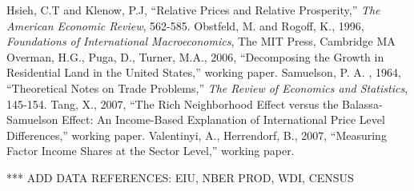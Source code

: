 \documentclass[12pt]{article}
\begin{document}
\begin{thebibliography}{99}
 Hsieh, C.T and Klenow, P.J, ``Relative Prices and
Relative Prosperity,'' \emph{The American Economic Review}, 562-585.
 Obstfeld, M. and Rogoff, K., 1996, \emph{Foundations of International Macroeconomics}, The MIT Press, Cambridge MA
 Overman, H.G., Puga, D., Turner, M.A., 2006, ``Decomposing the Growth in Residential Land in the United States,'' working paper.
 Samuelson, P. A. , 1964, ``Theoretical Notes on Trade Problems,'' \emph{The Review of Economics and Statistics}, 145-154.
\bibitem{} Tang, X., 2007, ``The Rich Neighborhood Effect versus the Balassa-Samuelson Effect: An Income-Based Explanation of International Price Level Differences,'' working paper.
 Valentinyi, A., Herrendorf, B., 2007, ``Measuring Factor Income Shares at the Sector Level,'' working paper.
\end{thebibliography}

*** ADD DATA REFERENCES: EIU, NBER PROD, WDI, CENSUS
\end{document}
